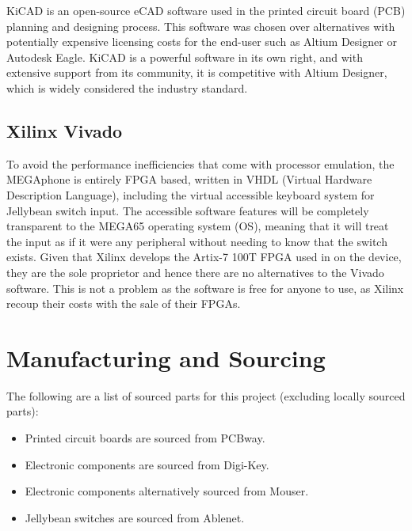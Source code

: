 KiCAD is an open-source eCAD software used in the printed circuit board (PCB) planning and designing process.
This software was chosen over alternatives with potentially expensive licensing costs for the end-user such as Altium Designer or Autodesk Eagle.
KiCAD is a powerful software in its own right, and with extensive support from its community, it is competitive with Altium Designer, which is widely considered the industry standard.


\subsection{Xilinx Vivado}

To avoid the performance inefficiencies that come with processor emulation, the MEGAphone is entirely FPGA based, written in VHDL (Virtual Hardware Description Language), including the virtual accessible keyboard system for Jellybean switch input.
The accessible software features will be completely transparent to the MEGA65 operating system (OS), meaning that it will treat the input as if it were any peripheral without needing to know that the switch exists.
Given that Xilinx develops the Artix-7 100T FPGA used in on the device, they are the sole proprietor and hence there are no alternatives to the Vivado software.
This is not a problem as the software is free for anyone to use, as Xilinx recoup their costs with the sale of their FPGAs.

\section{Manufacturing and Sourcing}

The following are a list of sourced parts for this project (excluding locally sourced parts):

\begin{itemize} 
    \item Printed circuit boards are sourced from PCBway. %
    \item Electronic components are sourced from Digi-Key.
    \item Electronic components alternatively sourced from Mouser.
    \item Jellybean switches are sourced from Ablenet.
    \end{itemize}

